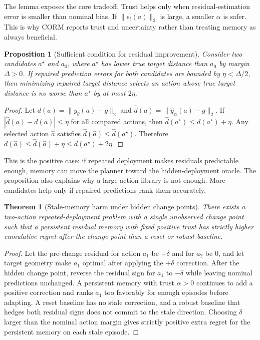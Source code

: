 \documentclass{article}
\newtheorem{proposition}{Proposition}
\newtheorem{theorem}{Theorem}
\begin{document}
The lemma exposes the core tradeoff. Trust helps only when residual-estimation error is smaller than nominal bias. If $\|\epsilon_t(a)\|_2$ is large, a smaller $\alpha$ is safer. This is why CORM reports trust and uncertainty rather than treating memory as always beneficial.

\begin{proposition}[Sufficient condition for residual improvement]
Consider two candidates $a^\star$ and $a_0$, where $a^\star$ has lower true target distance than $a_0$ by margin $\Delta>0$. If repaired prediction errors for both candidates are bounded by $\eta < \Delta/2$, then minimizing repaired target distance selects an action whose true target distance is no worse than $a^\star$ by at most $2\eta$.
\end{proposition}

\begin{proof}
Let $d(a)=\|y_\theta(a)-g\|_2$ and $\hat d(a)=\|\hat y_\alpha(a)-g\|_2$. If $|\hat d(a)-d(a)|\le \eta$ for all compared actions, then $\hat d(a^\star)\le d(a^\star)+\eta$. Any selected action $\hat a$ satisfies $\hat d(\hat a)\le \hat d(a^\star)$. Therefore $d(\hat a)\le \hat d(\hat a)+\eta\le d(a^\star)+2\eta$.
\end{proof}

This is the positive case: if repeated deployment makes residuals predictable enough, memory can move the planner toward the hidden-deployment oracle. The proposition also explains why a large action library is not enough. More candidates help only if repaired predictions rank them accurately.

\begin{theorem}[Stale-memory harm under hidden change points]
There exists a two-action repeated-deployment problem with a single unobserved change point such that a persistent residual memory with fixed positive trust has strictly higher cumulative regret after the change point than a reset or robust baseline.
\end{theorem}

\begin{proof}
Let the pre-change residual for action $a_1$ be $+\delta$ and for $a_2$ be $0$, and let target geometry make $a_1$ optimal after applying the $+\delta$ correction. After the hidden change point, reverse the residual sign for $a_1$ to $-\delta$ while leaving nominal predictions unchanged. A persistent memory with trust $\alpha>0$ continues to add a positive correction and ranks $a_1$ too favorably for enough episodes before adapting. A reset baseline has no stale correction, and a robust baseline that hedges both residual signs does not commit to the stale direction. Choosing $\delta$ larger than the nominal action margin gives strictly positive extra regret for the persistent memory on each stale episode.
\end{proof}
\end{document}
